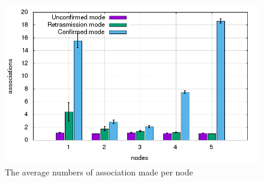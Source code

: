 \begin{figure}[htbp]
\centerline{\includegraphics[scale=0.4]{figures/averagetotalassociationsmade.png}}
\caption{The average numbers of association made per node}
\label{fig:associationnumber}
\end{figure}